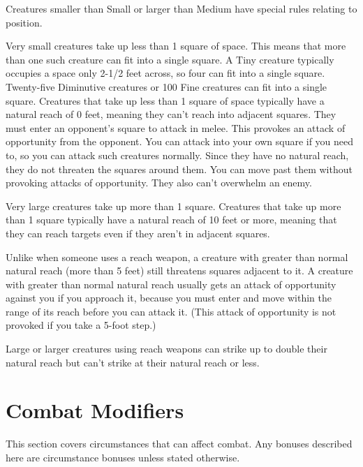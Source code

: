 Creatures smaller than Small or larger than Medium have special rules relating to position.

 Very small creatures take up less than 1 square of space. This means that more than one such creature can fit into a single square. A Tiny creature typically occupies a space only 2-1/2 feet across, so four can fit into a single square. Twenty-five Diminutive creatures or 100 Fine creatures can fit into a single square. Creatures that take up less than 1 square of space typically have a natural reach of 0 feet, meaning they can't reach into adjacent squares. They must enter an opponent's square to attack in melee. This provokes an attack of opportunity from the opponent. You can attack into your own square if you need to, so you can attack such creatures normally. Since they have no natural reach, they do not threaten the squares around them. You can move past them without provoking attacks of opportunity. They also can't overwhelm an enemy.

 Very large creatures take up more than 1 square.
Creatures that take up more than 1 square typically have a natural reach of 10 feet or more, meaning that they can reach targets even if they aren't in adjacent squares.

Unlike when someone uses a reach weapon, a creature with greater than normal natural reach (more than 5 feet) still threatens squares adjacent to it. A creature with greater than normal natural reach usually gets an attack of opportunity against you if you approach it, because you must enter and move within the range of its reach before you can attack it. (This attack of opportunity is not provoked if you take a 5-foot step.)

Large or larger creatures using reach weapons can strike up to double their natural reach but can't strike at their natural reach or less.

\section{Combat Modifiers}

This section covers circumstances that can affect combat. Any bonuses described here are circumstance bonuses unless stated otherwise.

